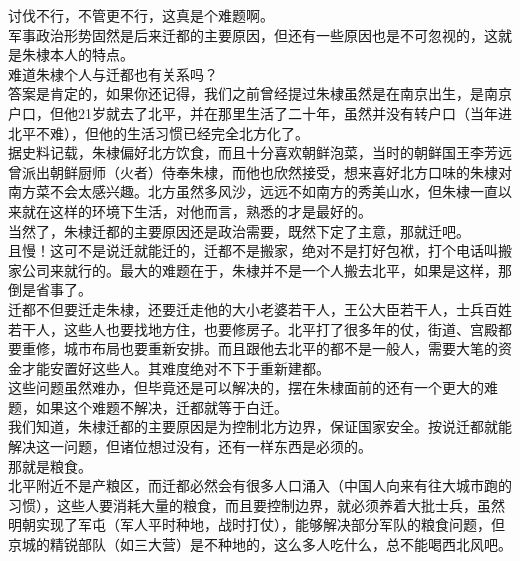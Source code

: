 \begin{multicols}{\theparacolNo}
讨伐不行，不管更不行，这真是个难题啊。\\

军事政治形势固然是后来迁都的主要原因，但还有一些原因也是不可忽视的，这就是朱棣本人的特点。\\

难道朱棣个人与迁都也有关系吗？\\

答案是肯定的，如果你还记得，我们之前曾经提过朱棣虽然是在南京出生，是南京户口，但他21岁就去了北平，并在那里生活了二十年，虽然并没有转户口（当年进北平不难），但他的生活习惯已经完全北方化了。\\

据史料记载，朱棣偏好北方饮食，而且十分喜欢朝鲜泡菜，当时的朝鲜国王李芳远曾派出朝鲜厨师（火者）侍奉朱棣，而他也欣然接受，想来喜好北方口味的朱棣对南方菜不会太感兴趣。北方虽然多风沙，远远不如南方的秀美山水，但朱棣一直以来就在这样的环境下生活，对他而言，熟悉的才是最好的。\\

当然了，朱棣迁都的主要原因还是政治需要，既然下定了主意，那就迁吧。\\

且慢！这可不是说迁就能迁的，迁都不是搬家，绝对不是打好包袱，打个电话叫搬家公司来就行的。最大的难题在于，朱棣并不是一个人搬去北平，如果是这样，那倒是省事了。\\

迁都不但要迁走朱棣，还要迁走他的大小老婆若干人，王公大臣若干人，士兵百姓若干人，这些人也要找地方住，也要修房子。北平打了很多年的仗，街道、宫殿都要重修，城市布局也要重新安排。而且跟他去北平的都不是一般人，需要大笔的资金才能安置好这些人。其难度绝对不下于重新建都。\\

这些问题虽然难办，但毕竟还是可以解决的，摆在朱棣面前的还有一个更大的难题，如果这个难题不解决，迁都就等于白迁。\\

我们知道，朱棣迁都的主要原因是为控制北方边界，保证国家安全。按说迁都就能解决这一问题，但诸位想过没有，还有一样东西是必须的。\\

那就是粮食。\\

北平附近不是产粮区，而迁都必然会有很多人口涌入（中国人向来有往大城市跑的习惯），这些人要消耗大量的粮食，而且要控制边界，就必须养着大批士兵，虽然明朝实现了军屯（军人平时种地，战时打仗），能够解决部分军队的粮食问题，但京城的精锐部队（如三大营）是不种地的，这么多人吃什么，总不能喝西北风吧。\\


\end{multicols}
